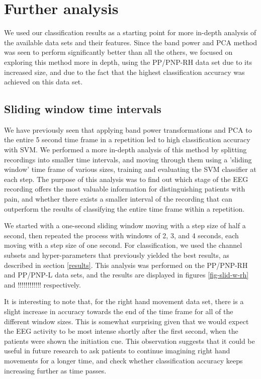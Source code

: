 \documentclass{mpaper}
\begin{document}
\section{Further analysis}

We used our classification results as a starting point for more in-depth analysis of the available data sets and their features. Since the band power and PCA method was seen to perform significantly better than all the others, we focused on exploring this method more in depth, using the PP/PNP-RH data set due to its increased size, and due to the fact that the highest classification accuracy was achieved on this data set.

\subsection{Sliding window time intervals}

We have previously seen that applying band power transformations and PCA to the entire 5 second time frame in a repetition led to high classification accuracy with SVM. We performed a more in-depth analysis of this method by splitting recordings into smaller time intervals, and moving through them using a 'sliding window' time frame of various sizes, training and evaluating the SVM classifier at each step. The purpose of this analysis was to find out which stage of the EEG recording offers the most valuable information for distinguishing patients with pain, and whether there exists a smaller interval of the recording that can outperform the results of classifying the entire time frame within a repetition.

We started with a one-second sliding window moving with a step size of half a second, then repeated the process with windows of 2, 3, and 4 seconds, each moving with a step size of one second. For classification, we used the channel subsets and hyper-parameters that previously yielded the best results, as described in section \ref{results}. This analysis was performed on the PP/PNP-RH and PP/PNP-L data sets, and the results are displayed in figures \ref{fig-slid-w-rh} and !!!!!!!!!!!! respectively.

It is interesting to note that, for the right hand movement data set, there is a slight increase in accuracy towards the end of the time frame for all of the different window sizes. This is somewhat surprising given that we would expect the EEG activity to be most intense shortly after the first second, when the patients were shown the initiation cue. This observation suggests that it could be useful in future research to ask patients to continue imagining right hand movements for a longer time, and check whether classification accuracy keeps increasing further as time passes.
\end{document}
